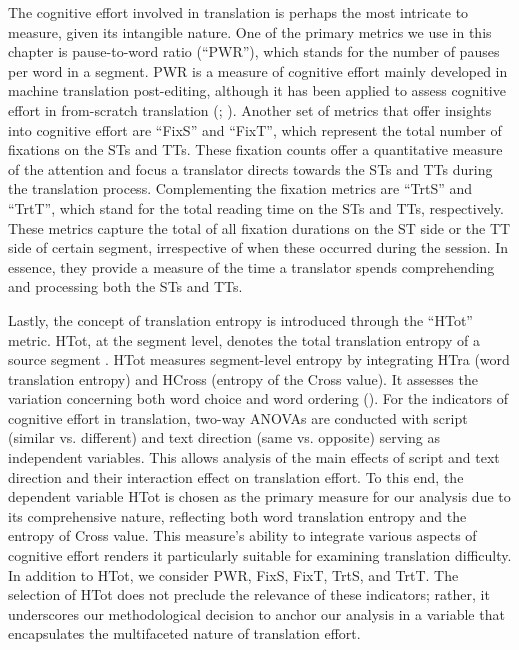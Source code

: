\documentclass[output=paper]{langscibook}
\begin{document}
The cognitive effort involved in translation is perhaps the most intricate to measure, given its intangible nature. One of the primary metrics we use in this chapter is pause-to-word ratio (“PWR”), which stands for the number of pauses per word in a segment. PWR is a measure of cognitive effort mainly developed in machine translation post-editing, although it has been applied to assess cognitive effort in from-scratch translation (\citealt{LacruzEtAl2016}; \citealt{LacruzEtAl2018}).  Another set of metrics that offer insights into cognitive effort are “FixS” and “FixT”, which represent the total number of fixations on the STs and TTs. These fixation counts offer a quantitative measure of the attention and focus a translator directs towards the STs and TTs during the translation process. Complementing the fixation metrics are “TrtS” and “TrtT”, which stand for the total reading time on the STs and TTs, respectively. These metrics capture the total of all fixation durations on the ST side or the TT side of certain segment, irrespective of when these occurred during the session. In essence, they provide a measure of the time a translator spends comprehending and processing both the STs and TTs.

Lastly, the concept of translation entropy is introduced through the “HTot” metric. HTot, at the segment level, denotes the total translation entropy of a source segment \citep{Carl2021}. HTot measures segment-level entropy by integrating HTra (word translation entropy) and HCross (entropy of the Cross value). It assesses the variation concerning both word choice and word ordering (\citealt{CarlSchaeffer2017}). For the indicators of cognitive effort in translation, two-way ANOVAs are conducted with script (similar vs. different) and text direction (same vs. opposite) serving as independent variables. This allows analysis of the main effects of script and text direction and their interaction effect on translation effort. To this end, the dependent variable HTot is chosen as the primary measure for our analysis due to its comprehensive nature, reflecting both word translation entropy and the entropy of Cross value. This measure’s ability to integrate various aspects of cognitive effort renders it particularly suitable for examining translation difficulty. In addition to HTot, we consider PWR, FixS, FixT, TrtS, and TrtT. The selection of HTot does not preclude the relevance of these indicators; rather, it underscores our methodological decision to anchor our analysis in a variable that encapsulates the multifaceted nature of translation effort.
\end{document}
